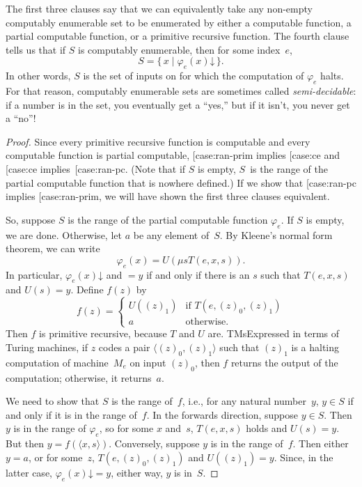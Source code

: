 \documentclass[10pt,a4paper]{article}
\makeatletter
\theoremstyle{plain}
\theoremstyle{definition}
\theoremstyle{remark}
\newenvironment{explain}{}{}
\newcommand{\olref}{\@ifnextchar[{\olref@i}{\olref@final}}
\def\olref@i[#1]{\@ifnextchar[{\olref@ii}{\olref@final}}
\def\olref@ii[#1]{\@ifnextchar[{\olref@iii}{\olref@final}}
\def\olref@iii[#1]{\olref@final}
\def\olref@final#1{\ref{#1}}
\providecommand{\tuple}[1]{\langle #1 \rangle}
\providecommand{\cfind}[1]{\varphi_{#1}}
\providecommand{\iftag}[1]{#1}
\providecommand{\fdefined}{\mathord{\downarrow}}
\providecommand{\Setabs}[2]{\{\, #1 \mid #2 \,\}}
\providecommand{\umin}{\mu}
\providecommand{\iftag}{}
\makeatother
\begin{document}
\begin{explain}
The first three clauses say that we can equivalently take any non-empty
computably enumerable set to be enumerated by either a computable
function, a partial computable function, or a primitive recursive
function. The fourth clause tells us that if $S$ is computably
enumerable, then for some index~$e$,
\[
S = \Setabs{x}{\cfind{e}(x) \fdefined}.
\]
In other words, $S$ is the set of inputs on for which the computation
of $\cfind{e}$ halts. For that reason, computably enumerable sets are
sometimes called \emph{semi-decidable}: if a number is in the set, you
eventually get a ``yes,'' but if it isn't, you never get a ``no''!{}
\end{explain}

\begin{proof}
Since every primitive recursive function is computable and every
computable function is partial computable, \olref{case:ran-prim}
implies \olref{case:ce} and \olref{case:ce}
implies~\olref{case:ran-pc}. (Note that if $S$ is empty, $S$~is the
range of the partial computable function that is nowhere defined.) If
we show that \olref{case:ran-pc} implies \olref{case:ran-prim}, we
will have shown the first three clauses equivalent.

So, suppose $S$ is the range of the partial computable function
$\cfind{e}$. If $S$ is empty, we are done. Otherwise, let $a$ be any
element of~$S$. By Kleene's normal form theorem, we can write
\[
\cfind{e}(x) = U(\umin{s}{T(e, x, s)}).
\]
In particular, $\cfind{e}(x) \fdefined$ and $= y$ if and only if there
is an $s$ such that $T(e, x, s)$ and $U(s) = y$. Define $f(z)$ by
\[
f(z) = \begin{cases}
  U((z)_1) & \text{if $T(e, (z)_0, (z)_1)$} \\
  a        & \text{otherwise.}
\end{cases}
\]
Then $f$ is primitive recursive, because $T$ and $U$
are. \iftag{TMs}{Expressed in terms of Turing machines, if $z$ codes a
  pair $\tuple{(z)_0, (z)_1}$ such that $(z)_1$ is a halting
  computation of machine~$M_e$ on input $(z)_0$, then $f$ returns the
  output of the computation; otherwise, it returns~$a$.}

We need to show that $S$ is the range of~$f$, i.e., for any natural
number~$y$, $y \in S$ if and only if it is in the range of~$f$. In the
forwards direction, suppose $y \in S$. Then $y$ is in the range of
$\cfind{e}$, so for some $x$ and~$s$, $T(e,x,s)$ holds and $U(s) = y$.
But then $y = f(\tuple{x,s})$. Conversely, suppose $y$ is in the range
of~$f$. Then either $y = a$, or for some~$z$, $T(e,(z)_0,(z)_1)$ and
$U((z)_1) = y$. Since, in the latter case, $\cfind{e}(x) \fdefined =
y$, either way, $y$ is in~$S$.


\end{proof}
\end{document}
